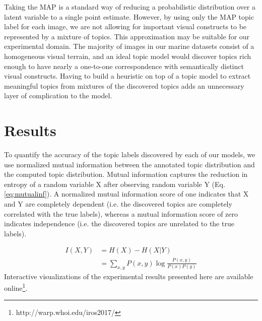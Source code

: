 \documentclass[letterpaper, 10 pt, conference]{ieeeconf}
\begin{document}
Taking the MAP is a standard way of reducing a probabilistic distribution over a latent variable to a single point estimate. However, by using only the MAP topic label for each image, we are not allowing for important visual constructs to be represented by a mixture of topics. This approximation may be suitable for our experimental domain. The majority of images in our marine datasets consist of a homogeneous visual terrain, and an ideal topic model would discover topics rich enough to have nearly a one-to-one correspondence with semantically distinct visual constructs. Having to build a heuristic on top of a topic model to extract meaningful topics from mixtures of the discovered topics adds an unnecessary layer of complication to the model.     


       

\section{Results}
To quantify the accuracy of the topic labels discovered by each of our models, we use normalized mutual information between the annotated topic distribution and the computed topic distribution. Mutual information captures the reduction in entropy of a random variable X after observing random variable Y (Eq. \ref{eq:mutualinf}). A normalized mutual information score of one indicates that X and Y are completely dependent (i.e. the discovered topics are completely correlated with the true labels), whereas a mutual information score of zero indicates independence (i.e. the discovered topics are unrelated to the true labels).
    
    \begin{equation} \label{eq:mutualinf}
    \begin{split}
        I(X, Y) & = H(X) - H(X|Y) \\
                & = \sum_{x,y} P(x,y) \log \frac{P(x,y)}{P(x)P(y)}
    \end{split}
    \end{equation}
Interactive visualizations of the experimental results presented here are available online\footnote{ http://warp.whoi.edu/iros2017/}.
    
\end{document}
